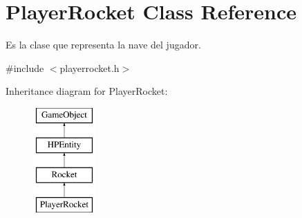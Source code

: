 \hypertarget{class_player_rocket}{\section{Player\-Rocket Class Reference}
\label{class_player_rocket}
}


Es la clase que representa la nave del jugador.  




{\ttfamily \#include $<$playerrocket.\-h$>$}

Inheritance diagram for Player\-Rocket\-:\begin{figure}[H]
\begin{center}
\leavevmode
\includegraphics[height=4.000000cm]{class_player_rocket}
\end{center}
\end{figure}
